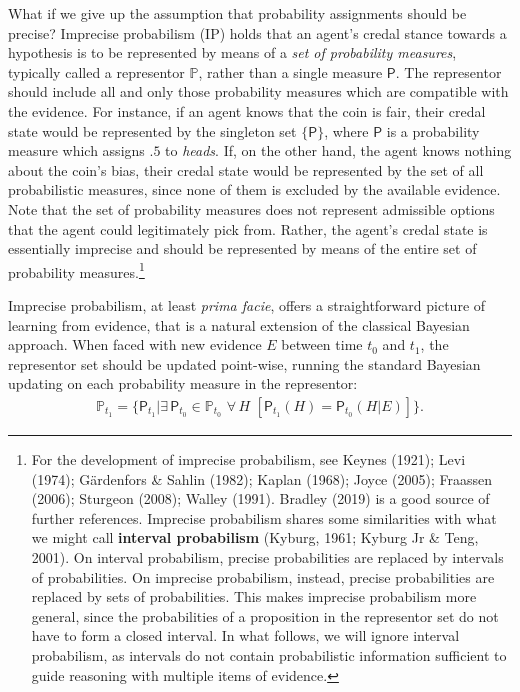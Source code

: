 \documentclass[
  10pt,
  dvipsnames,enabledeprecatedfontcommands]{scrartcl}
\begin{document}
What if we give up the assumption that probability assignments should be
precise? Imprecise probabilism (\textsf{IP}) holds that an agent's
credal stance towards a hypothesis is to be represented by means of a
\emph{set of probability measures}, typically called a representor
\(\mathbb{P}\), rather than a single measure \(\mathsf{P}\). The
representor should include all and only those probability measures which
are compatible with the evidence. For instance, if an agent knows that
the coin is fair, their credal state would be represented by the
singleton set \(\{\mathsf{P}\}\), where \(\mathsf{P}\) is a probability
measure which assigns \(.5\) to \emph{heads}. If, on the other hand, the
agent knows nothing about the coin's bias, their credal state would be
represented by the set of all probabilistic measures, since none of them
is excluded by the available evidence. Note that the set of probability
measures does not represent admissible options that the agent could
legitimately pick from. Rather, the agent's credal state is essentially
imprecise and should be represented by means of the entire set of
probability measures.\footnote{For the development of imprecise
  probabilism, see Keynes (1921); Levi (1974); Gärdenfors \& Sahlin
  (1982); Kaplan (1968); Joyce (2005); Fraassen (2006); Sturgeon (2008);
  Walley (1991). Bradley (2019) is a good source of further references.
  Imprecise probabilism shares some similarities with what we might call
  \textbf{interval probabilism} (Kyburg, 1961; Kyburg Jr \& Teng, 2001).
  On interval probabilism, precise probabilities are replaced by
  intervals of probabilities. On imprecise probabilism, instead, precise
  probabilities are replaced by sets of probabilities. This makes
  imprecise probabilism more general, since the probabilities of a
  proposition in the representor set do not have to form a closed
  interval. In what follows, we will ignore interval probabilism, as
  intervals do not contain probabilistic information sufficient to guide
  reasoning with multiple items of evidence.}

Imprecise probabilism, at least \emph{prima facie}, offers a
straightforward picture of learning from evidence, that is a natural
extension of the classical Bayesian approach. When faced with new
evidence \(E\) between time \(t_0\) and \(t_1\), the representor set
should be updated point-wise, running the standard Bayesian updating on
each probability measure in the representor:
\begin{align*} \label{eq:updateRepresentor}
\mathbb{P}_{t_1} = \{\mathsf{P}_{t_1}\vert \exists\, {\mathsf{P}_{t_0} \!\in  \mathbb{P}_{t_0}}\,\, \forall\, {H}\,\, \left[\mathsf{P}_{t_1}(H)=\mathsf{P}_{t_0}(H \vert E)\right] \}.
\end{align*}
\end{document}

